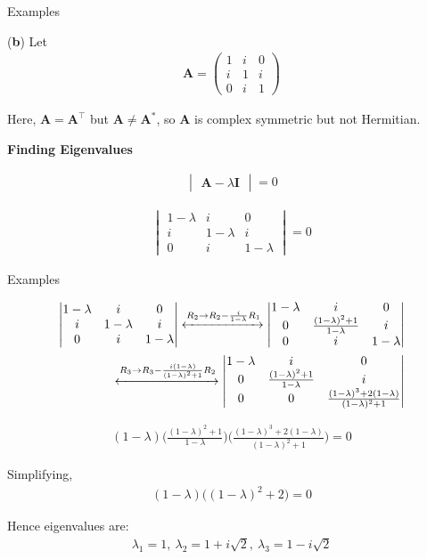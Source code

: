 \documentclass{beamer}
\numberwithin{equation}{section}
\theoremstyle{remark}
\newcommand{\myvec}[1]{\ensuremath{\begin{pmatrix}#1\end{pmatrix}}}
\newcommand{\mydet}[1]{\ensuremath{\begin{vmatrix}#1\end{vmatrix}}}
\let\vec\mathbf
\begin{document}
\begin{frame}{Examples}


(\textbf{b}) Let
\begin{align}
\vec{A} = \myvec{1 & i & 0\\ i & 1 & i\\ 0 & i & 1}
\end{align}

Here, $\vec{A} = \vec{A}^\top$ but $\vec{A} \ne \vec{A}^*$, so $\vec{A}$ is complex symmetric but not Hermitian.

\textbf{Finding Eigenvalues}

\begin{align}
\mydet{\vec{A} - \lambda \vec{I}} = 0
\end{align}

\begin{align}
\mydet{
1-\lambda & i & 0\\
i & 1-\lambda & i\\
0 & i & 1-\lambda
} = 0
\end{align}

\end{frame}

\begin{frame}{Examples}

\begin{align}
\mydet{
1-\lambda & i & 0\\
i & 1-\lambda & i\\
0 & i & 1-\lambda
}
\xleftrightarrow{R_2 \to R_2 - \frac{i}{1-\lambda} R_1}
\mydet{
1-\lambda & i & 0\\
0 & \frac{(1-\lambda)^2 + 1}{1-\lambda} & i\\
0 & i & 1-\lambda
}
\\
\xleftrightarrow{R_3 \to R_3 - \frac{i(1-\lambda)}{(1-\lambda)^2 + 1} R_2}
\mydet{
1-\lambda & i & 0\\
0 & \frac{(1-\lambda)^2 + 1}{1-\lambda} & i\\
0 & 0 & \frac{(1-\lambda)^3 + 2(1-\lambda)}{(1-\lambda)^2 + 1}
}
\end{align}

\begin{align}
(1-\lambda)\Big(\frac{(1-\lambda)^2 + 1}{1-\lambda}\Big)\Big(\frac{(1-\lambda)^3 + 2(1-\lambda)}{(1-\lambda)^2 + 1}\Big) = 0
\end{align}

Simplifying,
\begin{align}
(1-\lambda)\big((1-\lambda)^2 + 2\big) = 0
\end{align}

Hence eigenvalues are:
\begin{align}
\lambda_1 = 1,\ 
\lambda_2 = 1 + i\sqrt{2},\ 
\lambda_3 = 1 - i\sqrt{2}
\end{align}

\end{frame}
\end{document}
